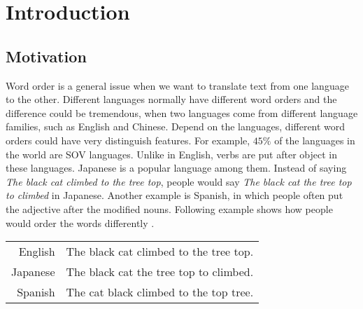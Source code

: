 
\chapter{Introduction}
\label{ch:Introduction}

\section{Motivation}
\label{ch:Introduction:sec:Motivation}

Word order is a general issue when we want to translate text from one language to the other. Different languages normally have different word orders and the difference could be tremendous, when two languages come from different language families, such as English and Chinese. Depend on the languages, different word orders could have very distinguish features. For example, $45\%$ of the languages in the world are \ac{SOV} languages. Unlike in English, verbs are put after object in these languages. Japanese is a popular language among them. Instead of saying \emph{The black cat climbed to the tree top}, people would say \emph{The black cat the tree top to climbed} in Japanese. Another example is Spanish, in which people often put the adjective after the modified nouns. Following example shows how people would order the words differently \citep{google}.


\begin{center}
\begin{tabular}{ r l }
English & The black cat climbed to the tree top. \\
Japanese & The black cat the tree top to climbed. \\
Spanish & The cat black climbed to the top tree. \\
\end{tabular}
\end{center}

